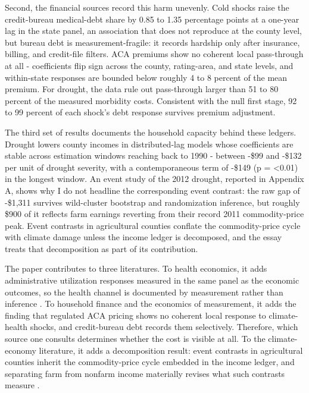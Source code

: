 \documentclass[a4paper,11pt]{article}
\begin{document}
Second, the financial sources record this harm unevenly. Cold shocks raise the credit-bureau medical-debt share by 0.85 to 1.35 percentage points at a one-year lag in the state panel, an association that does not reproduce at the county level, but bureau debt is measurement-fragile: it records hardship only after insurance, billing, and credit-file filters. ACA premiums show no coherent local pass-through at all - coefficients flip sign across the county, rating-area, and state levels, and within-state responses are bounded below roughly 4 to 8 percent of the mean premium. For drought, the data rule out pass-through larger than 51 to 80 percent of the measured morbidity costs. Consistent with the null first stage, 92 to 99 percent of each shock's debt response survives premium adjustment.

The third set of results documents the household capacity behind these ledgers. Drought lowers county incomes in distributed-lag models whose coefficients are stable across estimation windows reaching back to 1990 - between -\$99 and -\$132 per unit of drought severity, with a contemporaneous term of -\$149 (p = <0.01) in the longest window. An event study of the 2012 drought, reported in Appendix A, shows why I do not headline the corresponding event contrast: the raw gap of -\$1,311 survives wild-cluster bootstrap and randomization inference, but roughly \$900 of it reflects farm earnings reverting from their record 2011 commodity-price peak. Event contrasts in agricultural counties conflate the commodity-price cycle with climate damage unless the income ledger is decomposed, and the essay treats that decomposition as part of its contribution.

The paper contributes to three literatures. To health economics, it adds administrative utilization responses measured in the same panel as the economic outcomes, so the health channel is documented by measurement rather than inference \citep[nearest antecedent:][]{deryugina2019mortality}. To household finance and the economics of measurement, it adds the finding that regulated ACA pricing shows no coherent local response to climate-health shocks, and credit-bureau debt records them selectively. Therefore, which source one consults determines whether the cost is visible at all. To the climate-economy literature, it adds a decomposition result: event contrasts in agricultural counties inherit the commodity-price cycle embedded in the income ledger, and separating farm from nonfarm income materially revises what such contrasts measure \citep[nearest antecedents:][]{deschenes2007agricultural,deryugina2017fiscal}.
\end{document}
